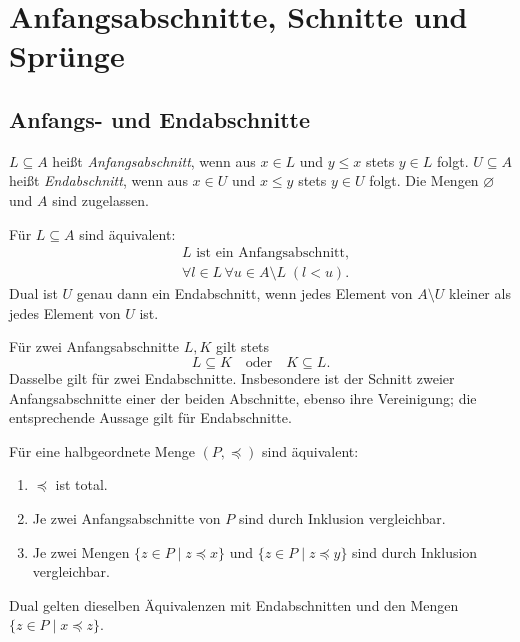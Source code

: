 \chapter{Anfangsabschnitte, Schnitte und Sprünge}
\label{b15guide:ch:sections}

\section{Anfangs- und Endabschnitte}

\begin{definition}
\label{b15guide:def:sections}
$L\subseteq A$ heißt \emph{Anfangsabschnitt}, wenn aus
$x\in L$ und $y\leq x$ stets $y\in L$ folgt.
$U\subseteq A$ heißt \emph{Endabschnitt}, wenn aus
$x\in U$ und $x\leq y$ stets $y\in U$ folgt.
Die Mengen $\varnothing$ und $A$ sind zugelassen.
\end{definition}

\begin{theorem}
\label{b15guide:thm:initial-separation}
Für $L\subseteq A$ sind äquivalent:
\[
\begin{aligned}
 &L\text{ ist ein Anfangsabschnitt},\\
 &\forall l\in L\,\forall u\in A\setminus L\;(l<u).
\end{aligned}
\]
Dual ist $U$ genau dann ein Endabschnitt, wenn
jedes Element von $A\setminus U$ kleiner als jedes Element von $U$ ist.
\end{theorem}

\begin{theorem}
\label{b15guide:thm:nested}
Für zwei Anfangsabschnitte $L,K$ gilt stets
\[
 L\subseteq K\quad\text{oder}\quad K\subseteq L.
\]
Dasselbe gilt für zwei Endabschnitte. Insbesondere ist
der Schnitt zweier Anfangsabschnitte einer der beiden Abschnitte,
ebenso ihre Vereinigung; die entsprechende Aussage gilt für Endabschnitte.
\end{theorem}

\begin{theorem}
\label{b15guide:thm:initial-criterion}
Für eine halbgeordnete Menge $(P,\preceq)$ sind äquivalent:
\begin{enumerate}
 \item $\preceq$ ist total.
 \item Je zwei Anfangsabschnitte von $P$ sind durch Inklusion vergleichbar.
 \item Je zwei Mengen $\{z\in P\mid z\preceq x\}$ und
       $\{z\in P\mid z\preceq y\}$ sind durch Inklusion vergleichbar.
\end{enumerate}
Dual gelten dieselben Äquivalenzen mit Endabschnitten
und den Mengen $\{z\in P\mid x\preceq z\}$.
\end{theorem}

